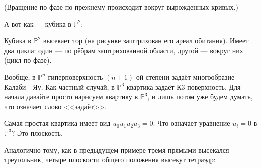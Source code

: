 \documentclass[11pt]{article}
\theoremstyle{remark}
\theoremstyle{definition}
\begin{document}
(Вращение по фазе по-прежнему происходит вокруг вырожденных кривых.)


А вот как --- кубика в $\mathbb{P}^2$:

\begin{center}
\end{center}

Кубика в $\mathbb{P}^2$ высекает тор (на рисунке заштрихован его ареал обитания). Имеет два цикла: один --- по рёбрам заштрихованной области, другой --- вокруг них (цикл по фазе).

Вообще, в $\mathbb{P}^n$ гиперповерхность $(n+1)$-ой степени задаёт многообразие Калаби---Яу. Как частный случай, в $\mathbb{P}^3$
квартика задаёт К3-поверхность. Для начала давайте просто нарисуем квартику в $\mathbb{P}^3$, и лишь потом уже будем думать, что означает слово <<задаёт>>.

Самая простая квартика имеет вид $u_0 u_1 u_2 u_3 = 0$. Что означает уравнение $u_i = 0$ в $\mathbb{P}^3$? Это плоскость.

Аналогично тому, как в предыдущем примере тремя прямыми высекался треугольник, четыре плоскости общего положения высекут тетраэдр:


\begin{center}
\end{center}
\end{document}
